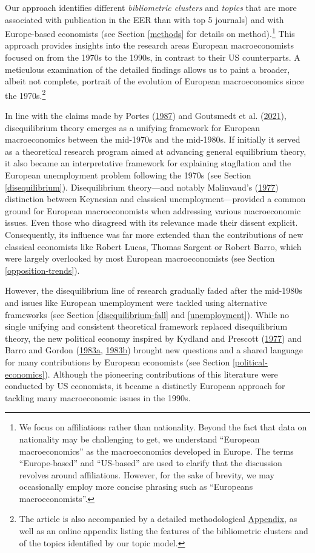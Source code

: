 \documentclass[
  12pt,
  onecolumn]{article}
\begin{document}
Our approach identifies different \emph{bibliometric clusters} and \emph{topics} that are more associated with publication in the EER than with top 5 journals) and with Europe-based economists (see Section \ref{methods} for details on method).\footnote{We focus on affiliations rather than nationality. Beyond the fact that data on nationality may be challenging to get, we understand ``European macroeconomics'' as the macroeconomics developed in Europe. The terms ``Europe-based'' and ``US-based'' are used to clarify that the discussion revolves around affiliations. However, for the sake of brevity, we may occasionally employ more concise phrasing such as ``Europeans macroeconomists''.} This approach provides insights into the research areas European macroeconomists focused on from the 1970s to the 1990s, in contrast to their US counterparts. A meticulous examination of the detailed findings allows us to paint a broader, albeit not complete, portrait of the evolution of European macroeconomics since the 1970s.\footnote{The article is also accompanied by a detailed methodological \protect\hyperlink{appendix}{Appendix}, as well as an online appendix listing the features of the bibliometric clusters and of the topics identified by our topic model.}

In line with the claims made by Portes (\protect\hyperlink{ref-portes1987}{1987}) and Goutsmedt et al. (\protect\hyperlink{ref-goutsmedt2021}{2021}), disequilibrium theory emerges as a unifying framework for European macroeconomics between the mid-1970s and the mid-1980s. If initially it served as a theoretical research program aimed at advancing general equilibrium theory, it also became an interpretative framework for explaining stagflation and the European unemployment problem following the 1970s (see Section \ref{disequilibrium}). Disequilibrium theory---and notably Malinvaud's (\protect\hyperlink{ref-malinvaud1977}{1977}) distinction between Keynesian and classical unemployment---provided a common ground for European macroeconomists when addressing various macroeconomic issues. Even those who disagreed with its relevance made their dissent explicit. Consequently, its influence was far more extended than the contributions of new classical economists like Robert Lucas, Thomas Sargent or Robert Barro, which were largely overlooked by most European macroeconomists (see Section \ref{opposition-trends}).

However, the disequilibrium line of research gradually faded after the mid-1980s and issues like European unemployment were tackled using alternative frameworks (see Section \ref{disequilibrium-fall} and \ref{unemployment}). While no single unifying and consistent theoretical framework replaced disequilibrium theory, the new political economy inspired by Kydland and Prescott (\protect\hyperlink{ref-kydland1977}{1977}) and Barro and Gordon (\protect\hyperlink{ref-barro1983}{1983a}, \protect\hyperlink{ref-barro1983c}{1983b}) brought new questions and a shared language for many contributions by European economists (see Section \ref{political-economics}). Although the pioneering contributions of this literature were conducted by US economists, it became a distinctly European approach for tackling many macroeconomic issues in the 1990s.
\end{document}
